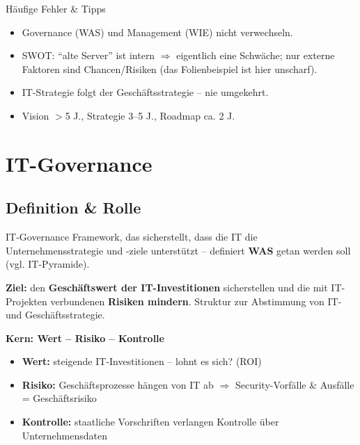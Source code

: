 \documentclass[a4paper, fontsize=7pt]{scrartcl}
\begin{document}
\begin{subbox}{Häufige Fehler \& Tipps}
\begin{itemize}
    \item Governance (WAS) und Management (WIE) nicht verwechseln.
    \item SWOT: ``alte Server'' ist intern $\Rightarrow$ eigentlich eine
          Schwäche; nur externe Faktoren sind Chancen/Risiken (das
          Folienbeispiel ist hier unscharf).
    \item IT-Strategie folgt der Geschäftsstrategie -- nie umgekehrt.
    \item Vision $>$5 J., Strategie 3--5 J., Roadmap ca. 2 J.
\end{itemize}
\end{subbox}

\section{IT-Governance}

\subsection{Definition \& Rolle}

\begin{mainbox}{IT-Governance}
Framework, das sicherstellt, dass die IT die Unternehmensstrategie und -ziele
unterstützt -- definiert \textbf{WAS} getan werden soll (vgl. IT-Pyramide).

\textbf{Ziel:} den \textbf{Geschäftswert der IT-Investitionen} sicherstellen
und die mit IT-Projekten verbundenen \textbf{Risiken mindern}. Struktur zur
Abstimmung von IT- und Geschäftsstrategie.

\textbf{Kern: Wert -- Risiko -- Kontrolle}
\begin{itemize}
    \item \textbf{Wert:} steigende IT-Investitionen -- lohnt es sich? (ROI)
    \item \textbf{Risiko:} Geschäftsprozesse hängen von IT ab
          $\Rightarrow$ Security-Vorfälle \& Ausfälle = Geschäftsrisiko
    \item \textbf{Kontrolle:} staatliche Vorschriften verlangen Kontrolle über
          Unternehmensdaten
\end{itemize}
\end{mainbox}
\end{document}
